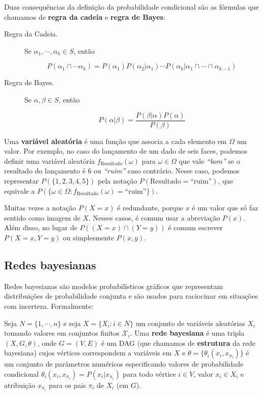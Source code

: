 Duas consequências da definição da probabilidade condicional são as fórmulas que chamamos de \textbf{regra da cadeia} e \textbf{regra de Bayes}:

\begin{description}
  \item[Regra da Cadeia.] Se $\alpha_1, \cdots, \alpha_k \in S$, então

    $$P(\alpha_1 \cap \cdots \alpha_k) = P(\alpha_1) P(\alpha_2 | \alpha_1) \cdots P(\alpha_k | \alpha_1 \cap \cdots \cap \alpha_{k-1})$$

  \item[Regra de Bayes.] Se $\alpha, \beta \in S$, então

    $$P(\alpha | \beta) = \frac{P(\beta | \alpha) P(\alpha)}{P(\beta)}$$
\end{description}

Uma \textbf{variável aleatória} é uma função que associa a cada elemento em $\Omega$ um valor. Por exemplo, no caso do lançamento de um dado de seis faces, podemos definir uma variável aleatória $f_{\text{Resultado}}(\omega)$ para $\omega \in \Omega$ que vale \emph{``bom''} se o resultado do lançamento é 6 ou \emph{``ruim''} caso contrário. Nesse caso, podemos representar $P(\{1, 2, 3, 4, 5\})$ pela notação $P(\text{Resultado} = \text{``ruim''})$, que equivale a $P(\{\omega \in \Omega : f_{\text{Resultado}}(\omega) = \text{``ruim''}\})$.

Muitas vezes a notação $P(X = x)$ é redundante, porque $x$ é um valor que só faz sentido como imagem de $X$. Nesses casos, é comum usar a abreviação $P(x)$. Além disso, no lugar de $P((X=x) \cap (Y=y))$ é comum escrever $P(X=x, Y=y)$ ou simplesmente $P(x, y)$.

\subsection{Redes bayesianas}

Redes bayesianas são modelos probabilísticos gráficos que representam distribuições de probabilidade conjunta e são usados para raciocinar em situações com incerteza. Formalmente:

\begin{definition}
  \cite{maua}
  Seja $N = \{ 1, \cdots, n \}$ e seja $X = \{X_i : i \in N\}$ um conjunto de variáveis aleatórias $X_i$ tomando valores em conjuntos finitos $\mathcal{X}_i$. Uma \textbf{rede bayesiana} é uma tripla $(X, G, \theta)$, onde $G = (V, E)$ é um DAG (que chamamos de \textbf{estrutura} da rede bayesiana) cujos vértices correspondem a variáveis em $X$ e $\theta = \{\theta_i(x_i, x_{\pi_i})\}$ é um conjunto de parâmetros numéricos especificando valores de probabilidade condicional $\theta_i(x_i, x_{\pi_i}) = P(x_i | x_{\pi_i})$ para todo vértice $i \in V$, valor $x_i \in X_i$ e atribuição $x_{\pi_i}$ para os pais $\pi_i$ de $X_i$ (em $G$).
\end{definition}

